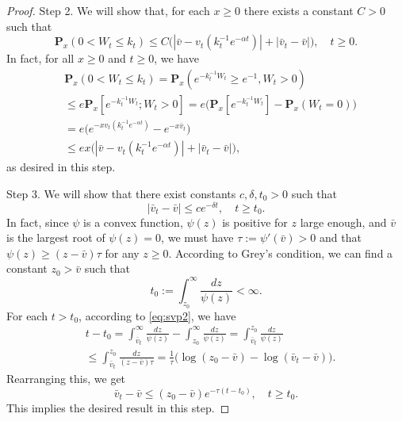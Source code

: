 \documentclass[12pt,a4paper]{amsart}
\theoremstyle{plain}
\theoremstyle{definition}
\numberwithin{equation}{section}
\begin{document}
\begin{proof}
    Step 2. We will show that, for each $x \geq 0$ there exists a constant $C>0$ such that
\[
    \mathbf P_{x}(0< W_t\leq k_t)
    \leq C\big(|\bar v- v_t(k_t^{-1}e^{-\alpha t})|+|\bar v_t - \bar v|\big),
    \quad t\geq 0.
\]
In fact, for all $x\geq 0$ and $t\geq 0$, we have
\begin{equation}\begin{split}
    &\mathbf P_{x}(0<W_t \leq k_t)
    = \mathbf P_{x}( e^{-k_t^{-1}W_t}\geq e^{-1},W_t > 0)
    \\&\leq e \mathbf P_{x}[e^{-k_t^{-1} W_t};W_t > 0]
    =  e\big(\mathbf P_x[e^{-k_t^{-1} W_t}]-\mathbf P_x(W_t = 0)\big)
    \\ &= e\big(e^{-xv_t(k_t^{-1} e^{-\alpha t})}-e^{-x\bar v_t}\big)
    \\&\leq ex \big(|\bar v-v_t(k_t^{-1} e^{-\alpha t})|+ |\bar v_t- \bar v|\big),
\end{split}\end{equation}
   as desired in this step.
   
    Step 3. We will show that there exist constants $c, \delta, t_0 > 0$ such that
\[
    |\bar v_t-\bar v|
    \leq ce^{-\delta t},
    \quad t\geq t_0.
\]
    In fact, since $\psi$ is a convex function, $\psi(z)$ is positive for $z$ large enough, and $\bar v$ is the largest root of $\psi(z)=0$, we must have $\tau:=\psi'(\bar v)>0$ and that  $\psi(z) \geq (z-\bar v)\tau$ for any $z\geq 0$.
    According to Grey's condition, we can find a constant $z_0 >\bar v $ such that
\[
    t_0
    := \int^\infty_{z_0} \frac{dz}{\psi(z)} < \infty.
\]
    For each $t > t_0$, according to \eqref{eq:svp2}, we have
\begin{equation}\begin{split}
    &t-t_0 = \int^\infty_{\bar v_t} \frac{dz}{\psi(z)} - \int_{z_0}^\infty \frac{dz}{\psi(z)}
    =\int_{\bar v_t}^{z_0} \frac{dz}{\psi(z)}
    \\ &\leq \int_{\bar v_t}^{z_0} \frac{dz}{(z-\bar v)\tau}
    = \frac{1}{\tau} \big(\log (z_0-\bar v) - \log(\bar v_t-\bar v)\big).
\end{split}\end{equation}
Rearranging this, we get
\[
    \bar v_t - \bar v \leq (z_0 - \bar v)e^{-\tau(t-t_0)},
    \quad t\geq t_0.
\]
    This implies the desired result in this step.


\end{proof}
\end{document}
